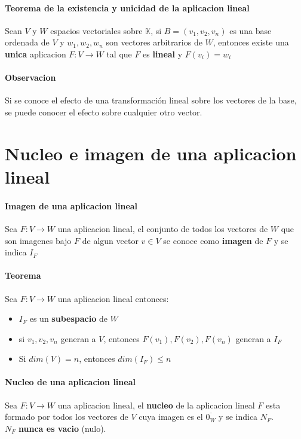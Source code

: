 \documentclass[10pt]{article}
\begin{document}
\paragraph{Teorema de la existencia y unicidad de la aplicacion lineal}

Sean $V$ y $W$ espacios vectoriales sobre $\mathbb{K}$, si $B = (v_1, v_2, v_n)$ es una base ordenada de $V$ y $w_1, w_2, w_n$ son vectores arbitrarios de $W$, entonces existe una \textbf{unica} aplicacion $F: V \rightarrow W$ tal que $F$ es \textbf{lineal} y $F(v_i) = w_i$
\paragraph{Observacion} Si se conoce el efecto de una transformación lineal sobre los vectores de la base, se puede conocer el efecto sobre cualquier otro vector.

\section{Nucleo e imagen de una aplicacion lineal}

\paragraph{Imagen de una aplicacion lineal}

Sea $F: V \rightarrow W$ una aplicacion lineal, el conjunto de todos los vectores de $W$ que son imagenes bajo $F$ de algun vector $v \in V$ se conoce como \textbf{imagen} de $F$ y se indica $I_F$
\paragraph{Teorema} Sea $F: V \rightarrow W$ una aplicacion lineal entonces:
\begin{itemize}
	\item $I_F$ es un \textbf{subespacio} de $W$
	\item si $v_1, v_2, v_n$ generan a $V$, entonces $F(v_1), F(v_2), F(v_n)$ generan a $I_F$
	\item Si $dim(V)=n$, entonces $dim(I_F) \leq n$
\end{itemize}

\paragraph{Nucleo de una aplicacion lineal} Sea $F: V \rightarrow W$ una aplicacion lineal, el \textbf{nucleo} de la aplicacion lineal $F$ esta formado por todos los vectores de $V$ cuya imagen es el $\overline{0_W}$ y se indica $N_F$.\\
$N_F$ \textbf{nunca es vacio} (nulo).
\end{document}
